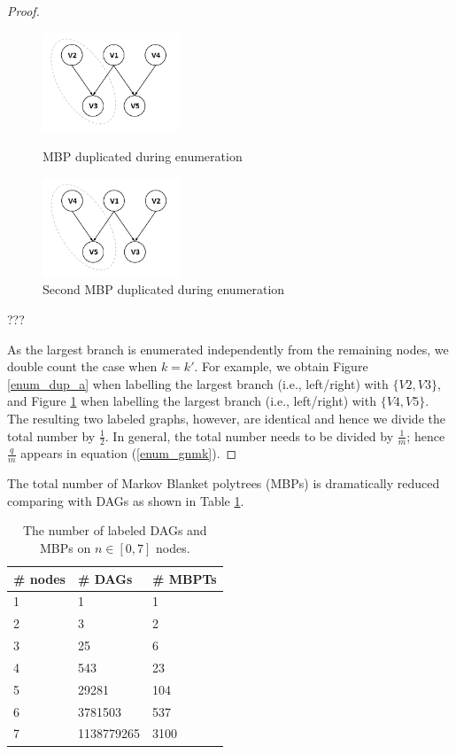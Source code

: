 \documentclass{svmult}
\begin{document}
\begin{proof}
\begin{figure}[htb]
\begin{minipage}[b]{0.35\textwidth}
	\includegraphics[width=1.6in]{figures/enum_mbpt1.png}
	\caption{MBP duplicated
          during enumeration}
	\label{enum_dup_a}
\end{minipage}
\hfill
\begin{minipage}[b]{0.35\textwidth}
	\includegraphics[width=1.6in]{figures/enum_mbpt2.png}
	\caption{Second MBP duplicated
          during enumeration}
	\label{enum_dup_b}
\end{minipage}
\end{figure}

???

As the largest branch is enumerated independently from the remaining
nodes, we double count the case when $k=k'$. For example, we obtain
Figure \ref{enum_dup_a} when labelling the largest branch (i.e.,
left/right) with $\{V2, V3\}$, and Figure \ref{enum_dup_b} when
labelling the largest branch (i.e., left/right) with $\{V4, V5\}$. The
resulting two labeled graphs, however, are identical and hence we
divide the total number by $\frac{1}{2}$. In general, the total
number needs to be divided by $\frac{1}{m}$; hence
$\frac{q}{m}$ appears in equation (\ref{enum_gnmk}).  \qedwhite
\end{proof}

The total number of Markov Blanket polytrees (MBPs) is dramatically reduced comparing with DAGs as shown in Table \ref{tb:nmbps}.

\begin{table}[]
\centering
\caption{The number of labeled DAGs and MBPs on $n \in [0, 7]$ nodes.}
\label{tb:nmbps}
\begin{tabular}{lll}
\hline
\# nodes & \# DAGs    & \# MBPTs \\ \hline
1        & 1          & 1        \\
2        & 3          & 2        \\
3        & 25         & 6        \\
4        & 543        & 23       \\
5        & 29281      & 104      \\
6        & 3781503    & 537      \\
7        & 1138779265 & 3100     \\ \hline
\end{tabular}
\end{table}
\end{document}
